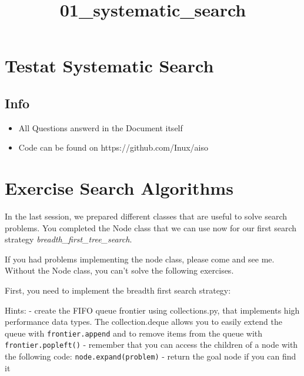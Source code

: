 \documentclass[11pt]{article}
\title{01\_systematic\_search}
\providecommand{\tightlist}{%
      \setlength{\itemsep}{0pt}\setlength{\parskip}{0pt}}
\begin{document}
    
    
    \maketitle
    
    

    
    \hypertarget{testat-systematic-search}{%
\section{Testat Systematic Search}\label{testat-systematic-search}}

\hypertarget{info}{%
\subsection{Info}\label{info}}

\begin{itemize}
\tightlist
\item
  All Questions answerd in the Document itself
\item
  Code can be found on https://github.com/Inux/aiso
\end{itemize}

    \hypertarget{exercise-search-algorithms}{%
\section{Exercise Search Algorithms}\label{exercise-search-algorithms}}

    In the last session, we prepared different classes that are useful to
solve search problems. You completed the Node class that we can use now
for our first search strategy \emph{breadth\_first\_tree\_search}.

If you had problems implementing the node class, please come and see me.
Without the Node class, you can't solve the following exercises.

First, you need to implement the breadth first search strategy:

Hints: - create the FIFO queue frontier using collections.py, that
implements high performance data types. The collection.deque allows you
to easily extend the queue with \texttt{frontier.append} and to remove
items from the queue with \texttt{frontier.popleft()} - remember that
you can access the children of a node with the following code:
\texttt{node.expand(problem)} - return the goal node if you can find it
\end{document}

